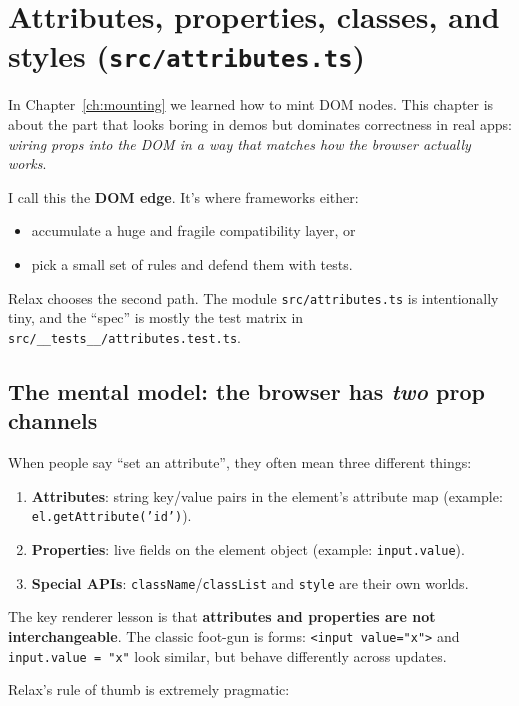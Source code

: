 \chapter{Attributes, properties, classes, and styles (\texttt{src/attributes.ts})}
\label{ch:attributes-props}

In Chapter~\ref{ch:mounting} we learned how to mint DOM nodes. This chapter is about the part that looks boring in demos but dominates correctness in real apps:
\emph{wiring props into the DOM in a way that matches how the browser actually works}.

I call this the \textbf{DOM edge}. It's where frameworks either:

\begin{itemize}
  \item accumulate a huge and fragile compatibility layer, or
  \item pick a small set of rules and defend them with tests.
\end{itemize}

Relax chooses the second path. The module \texttt{src/attributes.ts} is intentionally tiny, and the ``spec'' is mostly the test matrix in \texttt{src/\_\_tests\_\_/attributes.test.ts}.

\section{The mental model: the browser has \emph{two} prop channels}

When people say ``set an attribute'', they often mean three different things:

\begin{enumerate}
  \item \textbf{Attributes}: string key/value pairs in the element's attribute map (example: \texttt{el.getAttribute('id')}).
  \item \textbf{Properties}: live fields on the element object (example: \texttt{input.value}).
  \item \textbf{Special APIs}: \texttt{className}/\texttt{classList} and \texttt{style} are their own worlds.
\end{enumerate}

The key renderer lesson is that \textbf{attributes and properties are not interchangeable}. The classic foot-gun is forms:
	\texttt{<input value="x">} and \texttt{input.value = "x"} look similar, but behave differently across updates.

Relax's rule of thumb is extremely pragmatic:

